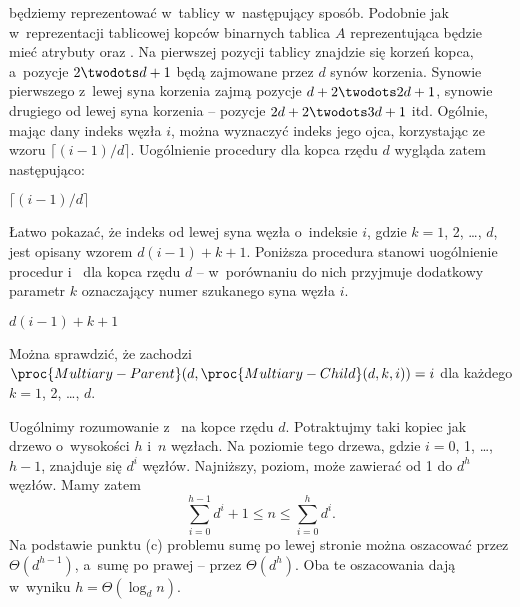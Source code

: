 
\subproblem %
 będziemy reprezentować w~tablicy w~następujący sposób.
Podobnie jak w~reprezentacji tablicowej kopców binarnych tablica $A$ reprezentująca  będzie mieć atrybuty  oraz .
Na pierwszej pozycji tablicy znajdzie się korzeń kopca, a~pozycje $2\twodots d+1$ będą zajmowane przez $d$ synów korzenia.
Synowie pierwszego z~lewej syna korzenia zajmą pozycje $d+2\twodots2d+1$, synowie drugiego od lewej syna korzenia -- pozycje $2d+2\twodots3d+1$ itd.
Ogólnie, mając dany indeks węzła $i$, można wyznaczyć indeks jego ojca, korzystając ze wzoru $\lceil(i-1)/d\rceil$.
Uogólnienie procedury  dla kopca rzędu $d$ wygląda zatem następująco:
\begin{codebox}
\zi	\Return $\lceil(i-1)/d\rceil$
\end{codebox}

Łatwo pokazać, że indeks  od lewej syna węzła o~indeksie $i$, gdzie $k=1$, 2, \dots, $d$, jest opisany wzorem $d(i-1)+k+1$.
Poniższa procedura stanowi uogólnienie procedur  i~ dla kopca rzędu $d$ -- w~porównaniu do nich przyjmuje dodatkowy parametr $k$ oznaczający numer szukanego syna węzła $i$.
\begin{codebox}
\zi	\Return $d(i-1)+k+1$
\end{codebox}

Można sprawdzić, że zachodzi $\proc{Multiary-Parent}(d,\proc{Multiary-Child}(d,k,i))=i$ dla każdego $k=1$, 2, \dots, $d$.

\subproblem %
Uogólnimy rozumowanie z~ na kopce rzędu $d$.
Potraktujmy taki kopiec jak drzewo  o~wysokości $h$ i~$n$ węzłach.
Na  poziomie tego drzewa, gdzie $i=0$, 1, \dots, $h-1$, znajduje się $d^i$ węzłów.
Najniższy,  poziom, może zawierać od 1 do $d^h$ węzłów.
Mamy zatem
\[
    \sum_{i=0}^{h-1}d^i+1 \le n \le \sum_{i=0}^hd^i.
\]
Na podstawie punktu (c) problemu  sumę po lewej stronie można oszacować przez $\Theta(d^{h-1})$, a~sumę po prawej -- przez $\Theta(d^h)$.
Oba te oszacowania dają w~wyniku $h=\Theta(\log_dn)$.

